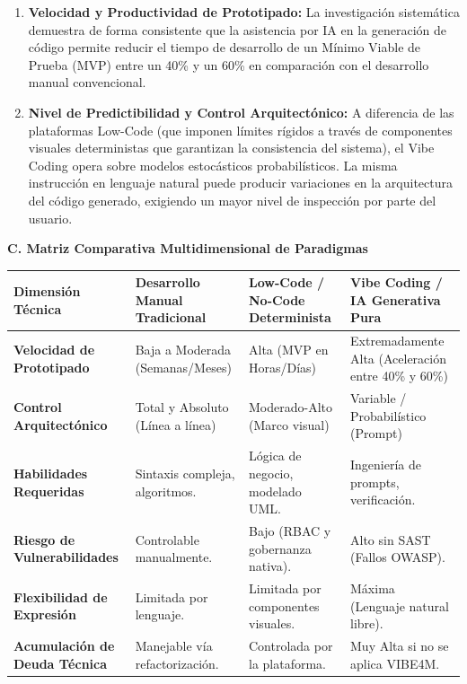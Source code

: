 \begin{enumerate}[label=\textbf{\Alph*.}, leftmargin=1.5cm]
    \item \textbf{Velocidad y Productividad de Prototipado:} La investigación sistemática demuestra de forma consistente que la asistencia por IA en la generación de código permite reducir el tiempo de desarrollo de un Mínimo Viable de Prueba (MVP) entre un 40\% y un 60\% en comparación con el desarrollo manual convencional.
    
    \item \textbf{Nivel de Predictibilidad y Control Arquitectónico:} A diferencia de las plataformas Low-Code (que imponen límites rígidos a través de componentes visuales deterministas que garantizan la consistencia del sistema), el Vibe Coding opera sobre modelos estocásticos probabilísticos. La misma instrucción en lenguaje natural puede producir variaciones en la arquitectura del código generado, exigiendo un mayor nivel de inspección por parte del usuario.
\end{enumerate}

\vspace{0.5cm}
\textbf{C. Matriz Comparativa Multidimensional de Paradigmas}

\begin{table}[htpb!]
    \centering
    \footnotesize
    \renewcommand{\arraystretch}{1.5}
    \begin{tabularx}{\textwidth}{>{\raggedright\arraybackslash\bfseries}p{2.8cm} >{\raggedright\arraybackslash}X >{\raggedright\arraybackslash}X >{\raggedright\arraybackslash}X}
    \toprule
    Dimensión Técnica & \textbf{Desarrollo Manual Tradicional} & \textbf{Low-Code / No-Code Determinista} & \textbf{Vibe Coding / IA Generativa Pura} \\
    \midrule
    Velocidad de Prototipado & Baja a Moderada (Semanas/Meses) & Alta (MVP en Horas/Días) & Extremadamente Alta (Aceleración entre 40\% y 60\%) \\
    Control Arquitectónico & Total y Absoluto (Línea a línea) & Moderado-Alto (Marco visual) & Variable / Probabilístico (Prompt) \\
    Habilidades Requeridas & Sintaxis compleja, algoritmos. & Lógica de negocio, modelado UML. & Ingeniería de prompts, verificación. \\
    Riesgo de Vulnerabilidades & Controlable manualmente. & Bajo (RBAC y gobernanza nativa). & Alto sin SAST (Fallos OWASP). \\
    Flexibilidad de Expresión & Limitada por lenguaje. & Limitada por componentes visuales. & Máxima (Lenguaje natural libre). \\
    Acumulación de Deuda Técnica & Manejable vía refactorización. & Controlada por la plataforma. & Muy Alta si no se aplica VIBE4M. \\
    \bottomrule
    \end{tabularx}
\end{table}

